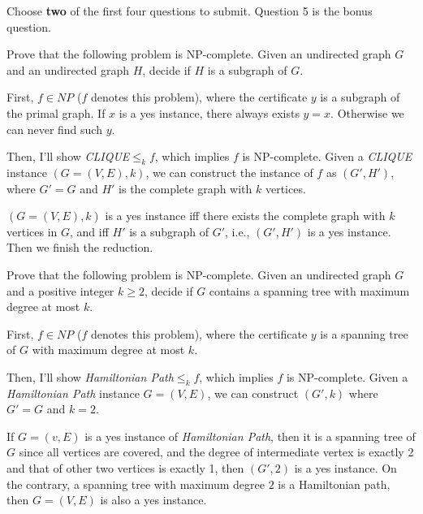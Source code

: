 \documentclass{oxmathproblems}
\begin{document}
Choose \textbf{two} of the first four questions to submit.
Question 5 is the bonus question.

\begin{questions}


\miquestion
Prove that the following problem is NP-complete.
Given an undirected graph $G$ and an undirected graph $H$, decide if $H$ is a subgraph of $G$.


\begin{Solution}

    First, $f\in NP$ ($f$ denotes this problem), where the certificate $y$ is a subgraph of the primal graph. If $x$ is a yes instance, there always exists $y=x$. Otherwise we can never find such $y$.

    Then, I'll show \textit{CLIQUE}$\leq_k f$, which implies $f$ is NP-complete. Given a \textit{CLIQUE} instance $(G=(V, E), k)$, we can construct the instance of $f$ as $(G', H')$, where $G'=G$ and $H'$ is the complete graph with $k$ vertices. 
    
    $(G=(V, E), k)$ is a yes instance iff there exists the complete graph with $k$ vertices in $G$, and iff $H'$ is a subgraph of $G'$, i.e., $(G', H')$ is a yes instance. Then we finish the reduction.
\end{Solution}

\vspace{1cm}

\miquestion
Prove that the following problem is NP-complete.
Given an undirected graph $G$ and a positive integer $k\geq 2$, decide if $G$ contains a spanning tree with maximum degree at most $k$.

\begin{Solution}

First, $f\in NP$ ($f$ denotes this problem), where the certificate $y$ is a spanning tree of $G$ with maximum degree at most $k$.

Then, I'll show \textit{Hamiltonian Path}$\le_kf$, which implies $f$ is NP-complete. Given a \textit{Hamiltonian Path} instance $G=(V, E)$, we can construct $(G', k)$ where $G'=G$ and $k=2$.

If $G=(v, E)$ is a yes instance of \textit{Hamiltonian Path}, then it is a spanning tree of $G$ since all vertices are covered, and the degree of intermediate vertex is exactly 2 and that of other two vertices is exactly 1, then $(G', 2)$ is a yes instance. On the contrary, a spanning tree with maximum degree $2$ is a Hamiltonian path, then $G=(V, E)$ is also a yes instance.


\end{Solution}
\end{questions}
\end{document}
